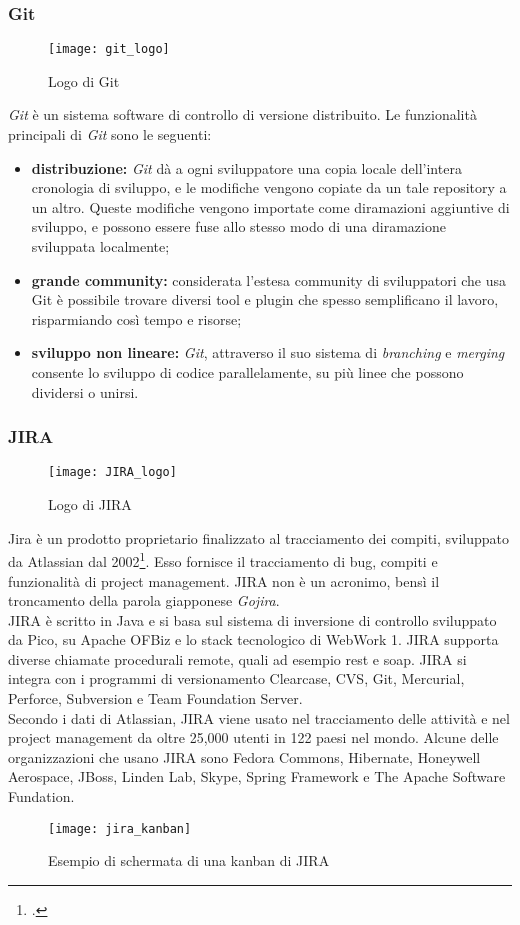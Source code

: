 \subsubsection{Git}
\begin{figure}[htb] 
    \centering 
    \texttt{[image: git\_logo]} 
    \caption{Logo di Git}
\end{figure}
\emph{Git} è un sistema software di controllo di versione distribuito. Le funzionalità principali di \emph{Git} sono le seguenti:
\begin{itemize}
	\item \textbf{distribuzione:} \emph{Git} dà a ogni sviluppatore una copia locale dell'intera cronologia di sviluppo, e le modifiche vengono copiate da un tale repository a un altro. Queste modifiche vengono importate come diramazioni aggiuntive di sviluppo, e possono essere fuse allo stesso modo di una diramazione sviluppata localmente;
	\item \textbf{grande community:} considerata l’estesa community di sviluppatori che usa
Git è possibile trovare diversi tool e plugin che spesso semplificano il lavoro,
risparmiando così tempo e risorse;
	\item \textbf{sviluppo non lineare:} \emph{Git}, attraverso il suo sistema di \emph{branching} e \emph{merging} consente lo sviluppo di codice parallelamente, su più linee che possono dividersi o unirsi.
\end{itemize}

\subsubsection{JIRA}
\begin{figure}[htb] 
    \centering 
    \texttt{[image: JIRA\_logo]} 
    \caption{Logo di JIRA}
\end{figure}
Jira è un prodotto proprietario finalizzato al tracciamento dei compiti, sviluppato da Atlassian dal 2002\footcite{atlassian:jira}. Esso fornisce il tracciamento di bug, compiti e funzionalità di project management. JIRA non è un acronimo, bensì il troncamento della parola giapponese \emph{Gojira}.\\
JIRA è scritto in Java e si basa sul sistema di inversione di controllo sviluppato da Pico, su Apache OFBiz e lo stack tecnologico di WebWork 1. JIRA supporta diverse chiamate procedurali remote, quali ad esempio \gls{rest} e \gls{soap}\glsfirstoccur. JIRA si integra con i programmi di versionamento Clearcase, CVS, Git, Mercurial, Perforce, Subversion e Team Foundation Server.\\
Secondo i dati di Atlassian, JIRA viene usato nel tracciamento delle attività e nel project management da oltre 25,000 utenti in 122 paesi nel mondo. Alcune delle organizzazioni che usano JIRA sono Fedora Commons, Hibernate, Honeywell Aerospace, JBoss, Linden Lab, Skype, Spring Framework e The Apache Software Fundation.
\begin{figure}[H] 
    \centering 
    \texttt{[image: jira\_kanban]} 
    \caption{Esempio di schermata di una kanban di JIRA}
\end{figure}


